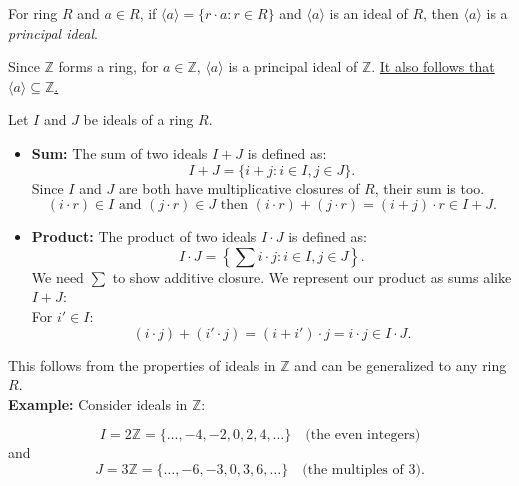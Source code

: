 \begin{Def}

    For ring $R$ and $a\in R$, if $\langle a \rangle = \{ r \cdot a : r \in R \}$
    and $\langle a \rangle$ is an ideal of $R$, then $\langle a \rangle$ is a \textit{principal ideal}.
\end{Def}

\noindent
Since $\mathbb{Z}$ forms a ring, for $a\in\mathbb{Z}$, $\langle a \rangle$ is a principal ideal of $\mathbb{Z}$. \underline{It also follows that $\langle a \rangle \subseteq \mathbb{Z}$.}

\newpage

\begin{Def}

    Let $I$ and $J$ be ideals of a ring $R$.
    \begin{itemize}
        \item \textbf{Sum:} The sum of two ideals $I + J$ is defined as:
              \[
                  I + J = \{ i + j : i \in I, j \in J \}.
              \]
              Since $I$ and $J$ are both have multiplicative closures of $R$, their sum is too.\\
              \[
                  (i\cdot r) \in I \text{ and } (j\cdot r) \in J \text{ then } (i\cdot r) + (j\cdot r) = (i+j)\cdot r \in I+J.
              \]
        \item \textbf{Product:} The product of two ideals $I \cdot J$ is defined as:
              \[
                  I \cdot J = \left\{ \sum i \cdot j : i \in I, j \in J \right\}.
              \]
              We need $\sum$ to show additive closure. We represent
              our product as sums alike $I+J$:\\
              For $i'\in I$:
              \[
                  (i\cdot j) + (i'\cdot j) = (i+i')\cdot j = i\cdot j \in I\cdot J.
              \]

    \end{itemize}
\end{Def}

\noindent
This follows from the properties of ideals in $\mathbb{Z}$ and can be generalized to any ring $R$.\\

\noindent
\textbf{Example:} Consider ideals in $\mathbb{Z}$:

\[
    I = 2\mathbb{Z} = \{ \ldots, -4, -2, 0, 2, 4, \ldots \} \quad \text{(the even integers)}
\]
and
\[
    J = 3\mathbb{Z} = \{ \ldots, -6, -3, 0, 3, 6, \ldots \} \quad \text{(the multiples of 3)}.
\]

